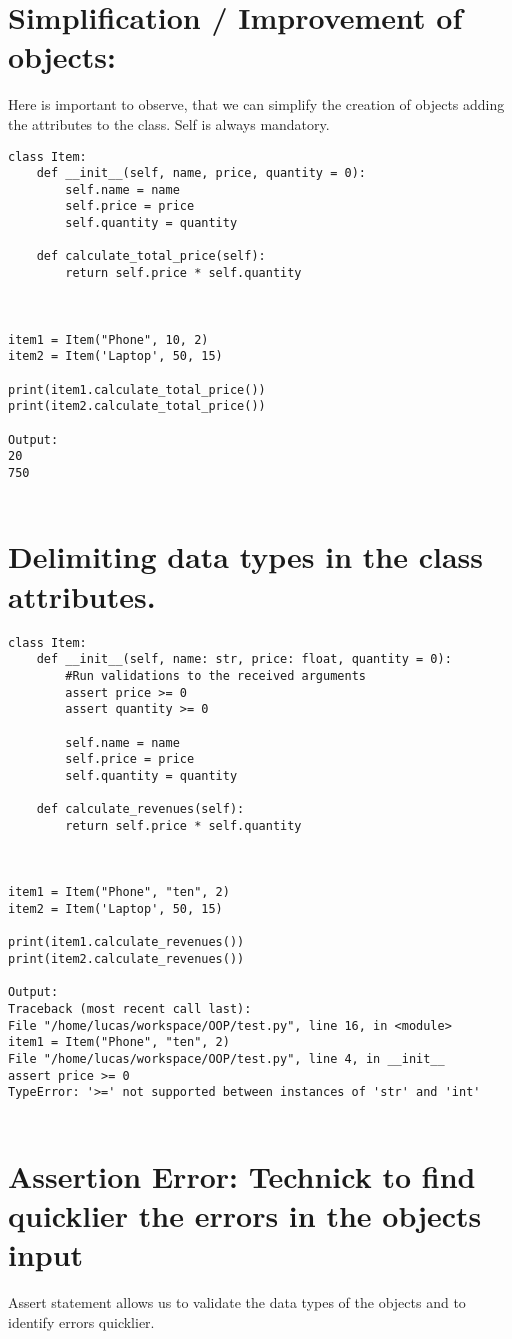 \documentclass{article}
\begin{document}
\section{Simplification / Improvement of objects:}
Here is important to observe, that we can simplify the creation of objects adding the attributes to the class. Self is always mandatory.

\begin{lstlisting}
class Item:
	def __init__(self, name, price, quantity = 0):
		self.name = name
		self.price = price
		self.quantity = quantity
	
	def calculate_total_price(self):
		return self.price * self.quantity



item1 = Item("Phone", 10, 2)
item2 = Item('Laptop', 50, 15)

print(item1.calculate_total_price())
print(item2.calculate_total_price())

Output:
20
750
	 
\end{lstlisting}

\section{Delimiting data types in the class attributes.}

\begin{lstlisting}
class Item:
	def __init__(self, name: str, price: float, quantity = 0):
		#Run validations to the received arguments
		assert price >= 0
		assert quantity >= 0
		
		self.name = name
		self.price = price
		self.quantity = quantity
		
	def calculate_revenues(self):
		return self.price * self.quantity
	
	

item1 = Item("Phone", "ten", 2)
item2 = Item('Laptop', 50, 15)

print(item1.calculate_revenues())
print(item2.calculate_revenues())

Output:
Traceback (most recent call last):
File "/home/lucas/workspace/OOP/test.py", line 16, in <module>
item1 = Item("Phone", "ten", 2)
File "/home/lucas/workspace/OOP/test.py", line 4, in __init__
assert price >= 0
TypeError: '>=' not supported between instances of 'str' and 'int'
	
\end{lstlisting}

\section{Assertion Error: Technick to find quicklier the errors in the objects input}
Assert statement allows us to validate the data types of the objects and to identify errors quicklier.
\end{document}

